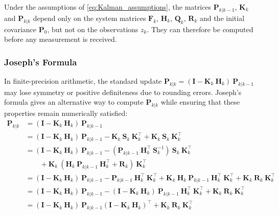 \begin{remark}
	Under the assumptions of \eqref{eq:Kalman_assumptions}, the matrices $\mathbf{P}_{k|k-1}$, $\mathbf{K}_k$ and $\mathbf{P}_{k|k}$ depend only on the system matrices $\mathbf{F}_k$, $\mathbf{H}_k$, $\mathbf{Q}_k$, $\mathbf{R}_k$ and the initial covariance $\mathbf{P}_0$, but not on the observations $z_k$. They can therefore be computed before any measurement is received.
\end{remark}

\subsubsection{Joseph's Formula}

In finite-precision arithmetic, the standard update $\mathbf{P}_{k|k}=(\mathbf{I}-\mathbf{K}_k\:\mathbf{H}_k)\:\mathbf{P}_{k|k-1}$ may lose symmetry or positive definiteness due to rounding errors. Joseph's formula \cite{bib:Joseph,bib:Kalman-numerics} gives an alternative way to compute $\mathbf{P}_{k|k}$ while ensuring that these properties remain numerically satisfied:
\begin{equation}
	\begin{aligned}
	\mathbf{P}_{k|k}&=(\mathbf{I}-\mathbf{K}_k\:\mathbf{H}_k)\:\mathbf{P}_{k|k-1}\\
	&=(\mathbf{I}-\mathbf{K}_k\:\mathbf{H}_k)\:\mathbf{P}_{k|k-1}-\mathbf{K}_k\:\mathbf{S}_k\:\mathbf{K}_k^\top+\mathbf{K}_k\:\mathbf{S}_k\:\mathbf{K}_k^\top\\
	&=(\mathbf{I}-\mathbf{K}_k\:\mathbf{H}_k)\:\mathbf{P}_{k|k-1}-(\mathbf{P}_{k|k-1}\:\mathbf{H}_k^\top\:\mathbf{S}_k^{-1})\:\mathbf{S}_k\:\mathbf{K}_k^\top\\
	&\qquad+\mathbf{K}_k\:(\mathbf{H}_k\:\mathbf{P}_{k|k-1}\:\mathbf{H}_k^\top+\mathbf{R}_k)\:\mathbf{K}_k^\top\\
	&=(\mathbf{I}-\mathbf{K}_k\:\mathbf{H}_k)\:\mathbf{P}_{k|k-1}-\mathbf{P}_{k|k-1}\:\mathbf{H}_k^\top\:\mathbf{K}_k^\top+\mathbf{K}_k\:\mathbf{H}_k\:\mathbf{P}_{k|k-1}\:\mathbf{H}_k^\top\:\mathbf{K}_k^\top+\mathbf{K}_k\:\mathbf{R}_k\:\mathbf{K}_k^\top\\
	&=(\mathbf{I}-\mathbf{K}_k\:\mathbf{H}_k)\:\mathbf{P}_{k|k-1}-(\mathbf{I}-\mathbf{K}_k\:\mathbf{H}_k)\:\mathbf{P}_{k|k-1}\:\mathbf{H}_k^\top\:\mathbf{K}_k^\top+\mathbf{K}_k\:\mathbf{R}_k\:\mathbf{K}_k^\top\\
	&=(\mathbf{I}-\mathbf{K}_k\:\mathbf{H}_k)\:\mathbf{P}_{k|k-1}(\mathbf{I}-\mathbf{K}_k\:\mathbf{H}_k)^\top+\mathbf{K}_k\:\mathbf{R}_k\:\mathbf{K}_k^\top
	\end{aligned}
\end{equation}

